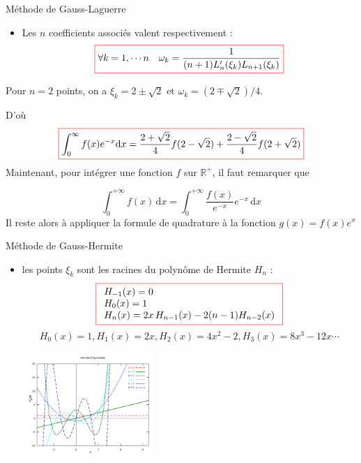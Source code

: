 \documentclass{beamer}
\def \de {{\rm d}}
\newcommand{\myredbox}[1]{\fcolorbox{red}{white}{$\displaystyle#1$}}
\begin{document}
\begin{frame}
\begin{block}{Méthode de Gauss-Laguerre}
\begin{itemize}
\item Les $n$ coefficients associés valent respectivement :
\[\myredbox{\forall k =1,\cdots n\quad \omega_k=\frac{1}{(n+1)L'_n(\xi_k)L_{n+1}(\xi_k)}}\]
\end{itemize}

Pour $n=2$ points, on a $\xi_k=2\pm\sqrt{2}$ et $\omega_k=(2\mp\sqrt{2})/4$.

D'où
\[\myredbox{\int_{0}^{\infty}f(x)e^{-x}\de x =\frac{2+\sqrt 2}{4}f( 2-\sqrt 2) + \frac{2-\sqrt 2}{4}f( 2+\sqrt 2) }\]
Maintenant, pour intégrer une fonction $f$ sur $\mathbb{R}^+$, il faut remarquer que

\[\int _{0}^{{+\infty }}f(x)\,{\mathrm  d}x=\int _{0}^{{+\infty }}{\frac  {f(x)}{e^{-x}}}e^{-x}\,{\mathrm  d}x\]
Il reste alors à appliquer la formule de quadrature à la fonction  $g(x)=f(x)e^{x}$
\end{block}
\end{frame}

\begin{frame}
\begin{block}{Méthode de Gauss-Hermite}
\begin{itemize}
\item les points $\xi_k$ sont les racines du polynôme de Hermite $H_n$ :
\[
\myredbox{
\begin{array}{l}
H_{-1}(x)=0 \\
H_0(x)=1\\
H_n(x)=2x\,H_{n-1}(x)-2(n-1) H_{n-2}(x)
\end{array}
}\]
\[H_0(x)=1, H_1(x)=2x, H_2(x)=4x^2-2, H_3(x)=8x^3-12x\cdots\]

\begin{center}
\includegraphics[width=5cm]{Hermite_poly.png}
\end{center}
\end{itemize}
\end{block}
\end{frame}
\end{document}
